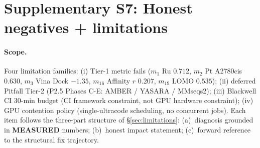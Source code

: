 %

\section*{Supplementary S7: Honest negatives + limitations}

\providecommand{\MEASURED}{\textbf{MEASURED}}
\providecommand{\PROJECTED}{\textbf{PROJECTED}}
\providecommand{\DESIGN}{\textbf{DESIGN}}
\providecommand{\CITEDONLY}{\textbf{CITED-ONLY}}

\paragraph{Scope.}
Four limitation families: (i) Tier-1 metric fails ($m_1$ Ru
$0.712$, $m_2$ Pt A2780cis $0.630$, $m_3$ Vina Dock $-1.35$,
$m_{16}$ Affinity $r$ $0.207$, $m_{19}$ LOMO $0.535$); (ii)
deferred Pitfall Tier-2 (P2.5 Phases C-E: AMBER / YASARA /
MMseqs2); (iii) Blackwell CI 30-min budget (CI framework
constraint, not GPU hardware constraint); (iv) GPU contention
policy (single-ultracode scheduling, no concurrent jobs).
Each item follows the three-part structure of
\S\ref{sec:limitations}: (a)~diagnosis grounded in \MEASURED{}
numbers; (b)~honest impact statement; (c)~forward reference to
the structural fix trajectory.

